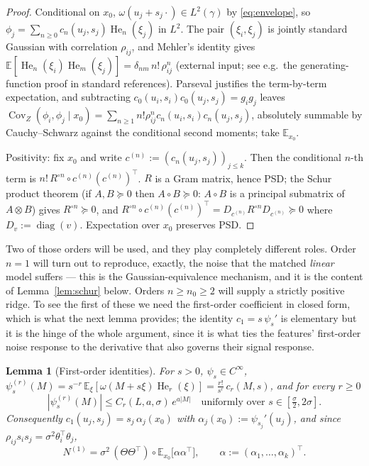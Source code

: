\documentclass[11pt]{article}
\newtheorem{lemma}{Lemma}
\theoremstyle{remark}
\newcommand{\E}{\mathbb{E}}
\newcommand{\Cov}{\operatorname{Cov}}
\newcommand{\diag}{\operatorname{diag}}
\newcommand{\He}{\operatorname{He}}
\begin{document}
\begin{proof}
Conditional on $x_0$, $\omega(u_j + s_j\cdot) \in L^2(\gamma)$ by \eqref{eq:envelope}, so $\phi_j = \sum_{n\ge0} c_n(u_j, s_j)\He_n(\xi_j)$ in $L^2$. The pair $(\xi_i, \xi_j)$ is jointly standard Gaussian with correlation $\rho_{ij}$, and Mehler's identity gives $\E[\He_n(\xi_i)\He_m(\xi_j)] = \delta_{nm}\, n!\, \rho_{ij}^n$ (external input; see e.g.\ the generating-function proof in standard references). Parseval justifies the term-by-term expectation, and subtracting $c_0(u_i,s_i)c_0(u_j,s_j) = g_ig_j$ leaves $\Cov_Z(\phi_i,\phi_j\mid x_0) = \sum_{n\ge1} n!\rho_{ij}^n c_n(u_i,s_i)c_n(u_j,s_j)$, absolutely summable by Cauchy--Schwarz against the conditional second moments; take $\E_{x_0}$.

Positivity: fix $x_0$ and write $c^{(n)} := (c_n(u_j,s_j))_{j\le k}$. Then the conditional $n$-th term is $n!\,R^{\circ n} \circ c^{(n)}(c^{(n)})^\top$. $R$ is a Gram matrix, hence PSD; the Schur product theorem (if $A, B \succeq 0$ then $A\circ B \succeq 0$: $A\circ B$ is a principal submatrix of $A\otimes B$) gives $R^{\circ n} \succeq 0$, and $R^{\circ n}\circ c^{(n)}(c^{(n)})^\top = D_{c^{(n)}} R^{\circ n} D_{c^{(n)}} \succeq 0$ where $D_v := \diag(v)$. Expectation over $x_0$ preserves PSD.
\end{proof}

\noindent Two of those orders will be used, and they play completely different roles. Order $n = 1$ will turn out to reproduce, exactly, the noise that the matched \emph{linear} model suffers --- this is the Gaussian-equivalence mechanism, and it is the content of Lemma~\ref{lem:schur} below. Orders $n \ge n_0 \ge 2$ will supply a strictly positive ridge. To see the first of these we need the first-order coefficient in closed form, which is what the next lemma provides; the identity $c_1 = s\,\psi_s'$ is elementary but it is the hinge of the whole argument, since it is what ties the features' first-order noise response to the derivative that also governs their signal response.

\begin{lemma}[First-order identities]\label{lem:c1}
For $s > 0$, $\psi_s \in C^\infty$, $\psi_s^{(r)}(M) = s^{-r}\,\E_\xi[\omega(M+s\xi)\He_r(\xi)] = \tfrac{r!}{s^{r}}\,c_r(M,s)$, and for every $r \ge 0$
\[
|\psi_s^{(r)}(M)| \le C_r(L, a, \sigma)\,e^{a|M|} \quad \text{uniformly over } s \in [\tfrac\sigma2, 2\sigma] .
\]
Consequently $c_1(u_j, s_j) = s_j\,\alpha_j(x_0)$ with $\alpha_j(x_0) := \psi_{s_j}'(u_j)$, and since $\rho_{ij}s_is_j = \sigma^2\theta_i^\top\theta_j$,
\[
N^{(1)} = \sigma^2\,(\Theta\Theta^\top)\circ \E_{x_0}\big[\alpha\alpha^\top\big], \qquad \alpha := (\alpha_1,\dots,\alpha_k)^\top .
\]
\end{lemma}
\end{document}
